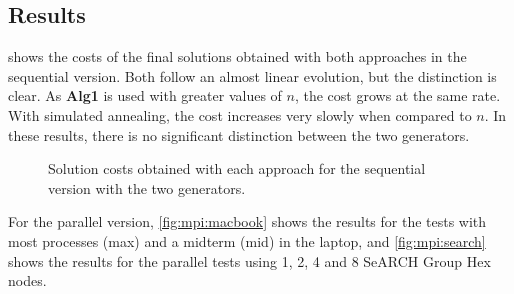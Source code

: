 \subsection{Results}
\label{sec:results}

 shows the costs of the final solutions obtained with both approaches in the sequential version. Both follow an almost linear evolution, but the distinction is clear. As \textbf{Alg1} is used with greater values of $n$, the cost grows at the same rate. With simulated annealing, the cost increases very slowly when compared to $n$. In these results, there is no significant distinction between the two generators.

\begin{figure}[!htp]
	\centering
	\hfill
	\caption[Sequential solution costs]{Solution costs obtained with each approach for the sequential version with the two generators.}
	\label{fig:seq}
\end{figure}

For the parallel version, \cref{fig:mpi:macbook} shows the results for the tests with most processes (max) and a midterm (mid) in the laptop, and \cref{fig:mpi:search} shows the results for the parallel tests using 1, 2, 4 and 8 SeARCH Group Hex nodes.

